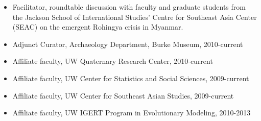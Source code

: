 \begin{itemize}[noitemsep, font=$\bullet$\scshape\bfseries]
\item  Facilitator, roundtable discussion with faculty and graduate students from the Jackson School of International Studies’ Centre for Southeast Asia Center (SEAC) on the emergent Rohingya crisis in Myanmar. 

\item Adjunct Curator, Archaeology Department, Burke Museum, 2010-current

\item Affiliate faculty, UW Quaternary Research Center, 2010-current

\item  Affiliate faculty, UW Center for Statistics and Social Sciences, 2009-current

\item  Affiliate faculty, UW Center for Southeast Asian Studies, 2009-current

\item  Affiliate faculty, UW IGERT Program in Evolutionary Modeling, 2010-2013

\end{itemize}

\medskip

